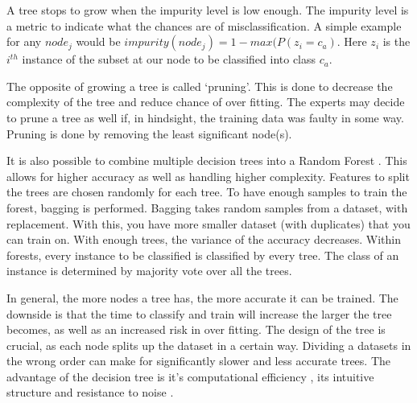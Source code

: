 A tree stops to grow when the impurity level is low enough. The impurity level is a metric to indicate what the chances are of misclassification. A simple example for any $node_j$ would be $impurity(node_j) = 1 - max(P(z_i = c_a) $. Here $z_i$ is the $i^{th}$ instance of the subset at our node to be classified into class $c_a$. 

The opposite of growing a tree is called `pruning'. This is done to decrease the complexity of the tree and reduce chance of over fitting. The experts may decide to prune a tree as well if, in hindsight, the training data was faulty in some way. Pruning is done by removing the least significant node(s). 

It is also possible to combine multiple decision trees into a Random Forest \cite{Topouzelis201268}. This allows for higher accuracy as well as handling higher complexity. Features to split the trees are chosen randomly for each tree. To have enough samples to train the forest, bagging is performed. Bagging takes random samples from a dataset, with replacement. With this, you have more smaller dataset (with duplicates) that you can train on. With enough trees, the variance of the accuracy decreases. Within forests, every instance to be classified is classified by every tree. The class of an instance is determined by majority vote over all the trees. 

In general, the more nodes a tree has, the more accurate it can be trained. The downside is that the time to classify and train will increase the larger the tree becomes, as well as an increased risk in over fitting. The design of the tree is crucial, as each node splits up the dataset in a certain way. Dividing a datasets in the wrong order can make for significantly slower and less accurate trees. The advantage of the decision tree is it's computational efficiency \cite{safavian1991survey}, its intuitive structure and resistance to noise \cite{LópezChau20136283}.